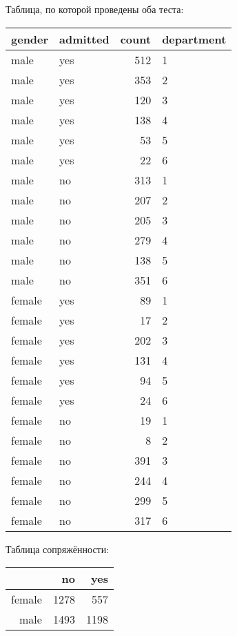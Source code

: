 \documentclass[a4paper,12pt]{article}
\begin{document}
Таблица, по которой проведены оба теста:

\begin{table}[ht]
    \centering
    \begin{tabular}{llrl}
        \hline
        gender & admitted & count & department \\
        \hline
        male & yes & 512 & 1 \\
        male & yes & 353 & 2 \\
        male & yes & 120 & 3 \\
        male & yes & 138 & 4 \\
        male & yes &  53 & 5 \\
        male & yes &  22 & 6 \\
        male & no & 313 & 1 \\
        male & no & 207 & 2 \\
        male & no & 205 & 3 \\
        male & no & 279 & 4 \\
        male & no & 138 & 5 \\
        male & no & 351 & 6 \\
        female & yes &  89 & 1 \\
        female & yes &  17 & 2 \\
        female & yes & 202 & 3 \\
        female & yes & 131 & 4 \\
        female & yes &  94 & 5 \\
        female & yes &  24 & 6 \\
        female & no &  19 & 1 \\
        female & no &   8 & 2 \\
        female & no & 391 & 3 \\
        female & no & 244 & 4 \\
        female & no & 299 & 5 \\
        female & no & 317 & 6 \\
        \hline
    \end{tabular}
\end{table}

Таблица сопряжённости:

\begin{table}[H]
    \centering
    \begin{tabular}{rrr}
        \hline
        & no & yes \\
        \hline
        female & 1278 & 557 \\
        male & 1493 & 1198 \\
        \hline
    \end{tabular}
\end{table}
\end{document}
